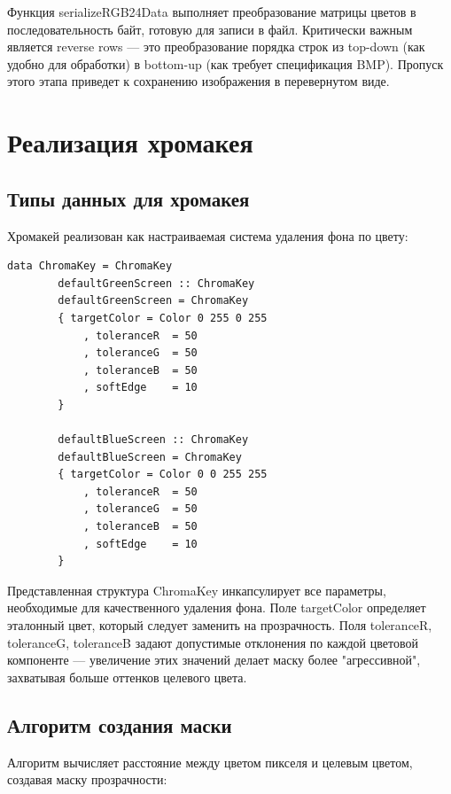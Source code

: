 \documentclass[a4paper,12pt]{article}
\begin{document}
	Функция serializeRGB24Data выполняет преобразование матрицы цветов в последовательность байт, готовую для записи в файл. Критически важным является reverse rows — это преобразование порядка строк из top-down (как удобно для обработки) в bottom-up (как требует спецификация BMP). Пропуск этого этапа приведет к сохранению изображения в перевернутом виде.
	
	
	\newpage
	\section{Реализация хромакея}
	
	\subsection{Типы данных для хромакея}
	
	Хромакей реализован как настраиваемая система удаления фона по цвету:
	
	\begin{lstlisting}[caption=Типы данных для хромакея, label=lst:chroma-types]
		data ChromaKey = ChromaKey
		defaultGreenScreen :: ChromaKey
		defaultGreenScreen = ChromaKey
		{ targetColor = Color 0 255 0 255
			, toleranceR  = 50
			, toleranceG  = 50
			, toleranceB  = 50
			, softEdge    = 10
		}
		
		defaultBlueScreen :: ChromaKey
		defaultBlueScreen = ChromaKey
		{ targetColor = Color 0 0 255 255
			, toleranceR  = 50
			, toleranceG  = 50
			, toleranceB  = 50
			, softEdge    = 10
		}
	\end{lstlisting}
	
	Представленная структура ChromaKey инкапсулирует все параметры, необходимые для качественного удаления фона. Поле targetColor определяет эталонный цвет, который следует заменить на прозрачность. Поля toleranceR, toleranceG, toleranceB задают допустимые отклонения по каждой цветовой компоненте — увеличение этих значений делает маску более "агрессивной", захватывая больше оттенков целевого цвета.
	
	\subsection{Алгоритм создания маски}
	
	Алгоритм вычисляет расстояние между цветом пикселя и целевым цветом, создавая маску прозрачности:
	
\end{document}
